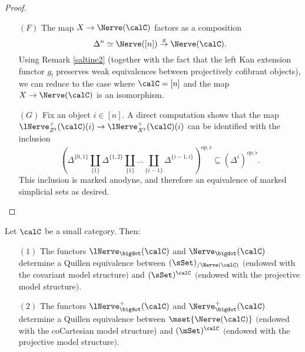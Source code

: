 \begin{proof}
\begin{itemize}
Let $Z = \Delta^{ \{0,1\} } \coprod_{ \{ 1\} } \Delta^{ \{1,2\} } \coprod_{ \{1\} } \ldots
\coprod_{ \{n-1\}} \Delta^{ \{n-1, n \}}$ so that $Z \subseteq X$ is an inner anodyne inclusion.
We have a commutative diagram
$$ \xymatrix{ \St^{+}_{\phi} (Z^{op})^{\flat} \ar[r]^{u} \ar[d]^{v} & \St^{+}_{\phi}(X^{op})^{\flat} \ar[d] \\
\lNerve^{+}_{ Z^{\flat}}(\calC)^{op} \ar[r]^{w} & \lNerve^{+}_{ X^{\flat}}(\calC)^{op}. }$$
The inductive hypothesis implies that $v$ is a weak equivalence, and Proposition \ref{spec2} implies that $u$ is a weak equivalence. To complete the proof, it will suffice to show that
$w$ is a weak equivalence. 

\item[$(F)$] The map $X \rightarrow \Nerve(\calC)$ factors as a composition
$$ \Delta^n \simeq \Nerve( [n] ) \stackrel{g}{\rightarrow} \Nerve(\calC).$$
Using Remark \ref{saltine2} (together with the fact that the left
Kan extension functor $g_!$ preserves weak equivalences between projectively cofibrant objects),
we can reduce to the case where $\calC = [n]$ and the map $X \rightarrow \Nerve(\calC)$ is an isomorphism.

\item[$(G)$] Fix an object $i \in [n]$. A direct computation shows that the map
$\lNerve^{+}_{Z^{\flat}}(\calC)(i) \rightarrow \lNerve^{+}_{X^{\flat}}(\calC)(i)$ can be identified with the inclusion 
$$ (  \Delta^{ \{0,1\} } \coprod_{ \{ 1\} } \Delta^{ \{1,2\} } \coprod_{ \{1\} } \ldots
\coprod_{ \{i-1\}} \Delta^{ \{i-1, i \}})^{op, \flat} \subseteq (\Delta^{i})^{op, \flat}.$$
This inclusion is marked anodyne, and therefore an equivalence of marked simplicial sets as desired.
\end{itemize}
\end{proof}

\begin{proposition}\label{kudd}
Let $\calC$ be a small category. Then:
\begin{itemize}
\item[$(1)$] The functors $\lNerve_{\bigdot}(\calC)$ and $\Nerve_{\bigdot}(\calC)$ determine
a Quillen equivalence between $( \sSet)_{/ \Nerve(\calC)}$ $($endowed with the covariant model structure$)$
and $(\sSet)^{\calC}$ $($endowed with the projective model structure$)$.
\item[$(2)$] The functors $\lNerve^{+}_{\bigdot}(\calC)$ and $\Nerve^{+}_{\bigdot}(\calC)$ determine
a Quillen equivalence between $\mset{ \Nerve(\calC)}$ $($endowed with the coCartesian model structure) and $(\mSet)^{\calC}$ $($endowed with the projective model structure$)$.
\end{itemize}
\end{proposition}

